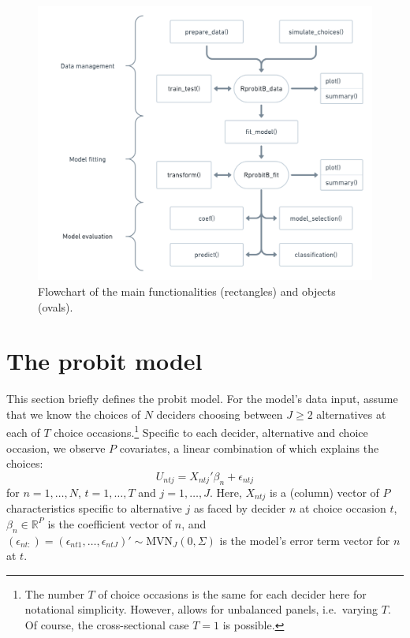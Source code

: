 \documentclass[article,shortnames]{jss}
\begin{document}
\begin{figure}[!ht]
  \includegraphics{flowchart.png}
  \caption{Flowchart of the main  functionalities (rectangles) and objects (ovals).}
  \label{fig:flowchart}
\end{figure}

\section{The probit model} \label{sec:probit_model}

This section briefly defines the probit model. For the model's data input, assume that we know the choices of $N$ deciders choosing between $J \geq 2$ alternatives at each of $T$ choice occasions.\footnote{The number $T$ of choice occasions is the same for each decider here for notational simplicity. However,  allows for unbalanced panels, i.e.\ varying $T$. Of course, the cross-sectional case $T = 1$ is possible.} Specific to each decider, alternative and choice occasion, we observe $P$ covariates, a linear combination of which explains the choices:
\begin{equation}
  \label{eq:utility}
  U_{ntj} = X_{ntj}'\beta_n + \epsilon_{ntj}
\end{equation}
for $n=1,\dots,N$, $t=1,\dots,T$ and $j=1,\dots,J$. Here, $X_{ntj}$ is a (column) vector of $P$ characteristics specific to alternative $j$ as faced by decider $n$ at choice occasion $t$, $\beta_n \in {\mathbb R}^{P}$ is the coefficient vector of $n$, and $(\epsilon_{nt:}) = (\epsilon_{nt1},\dots,\epsilon_{ntJ})' \sim \text{MVN}_{J} (0,\Sigma)$ is the model's error term vector for $n$ at $t$.
\end{document}
